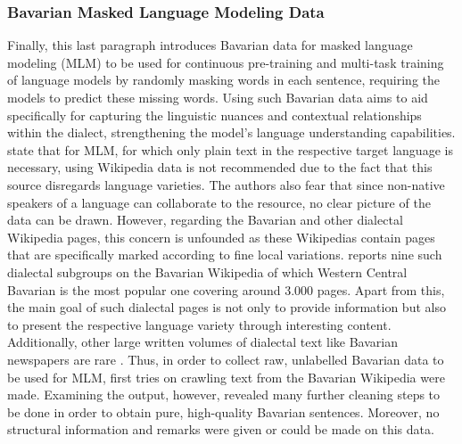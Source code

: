 \documentclass[11pt,a4paper,twoside,openright]{scrbook}
\begin{document}
\subsubsection{Bavarian Masked Language Modeling Data}

Finally, this last paragraph introduces Bavarian data for masked language modeling (MLM) to be used for continuous pre-training and multi-task training of language models by randomly masking words in each sentence, requiring the models to predict these missing words. Using such Bavarian data aims to aid specifically for capturing the linguistic nuances and contextual relationships within the dialect, strengthening the model's language understanding capabilities. \citet{Zampieri_Nakov_Scherrer_2020} state that for MLM, for which only plain text in the respective target language is necessary, using Wikipedia data is not recommended due to the fact that this source disregards language varieties. The authors also fear that since non-native speakers of a language can collaborate to the resource, no clear picture of the data can be drawn. However, regarding the Bavarian and other dialectal Wikipedia pages, this concern is unfounded as these Wikipedias contain pages that are specifically marked according to fine local variations. \citet{artemova-plank-2023-low} reports nine such dialectal subgroups on the Bavarian Wikipedia of which Western Central Bavarian is the most popular one covering around 3.000 pages. Apart from this, the main goal of such dialectal pages is not only to provide information but also to present the respective language variety through interesting content. Additionally, other large written volumes of dialectal text like Bavarian newspapers are rare \citep{artemova-plank-2023-low}. Thus, in order to collect raw, unlabelled Bavarian data to be used for MLM, first tries on crawling text from the Bavarian Wikipedia were made. Examining the output, however, revealed many further cleaning steps to be done in order to obtain pure, high-quality Bavarian sentences. Moreover, no structural information and remarks were given or could be made on this data. 
\end{document}
